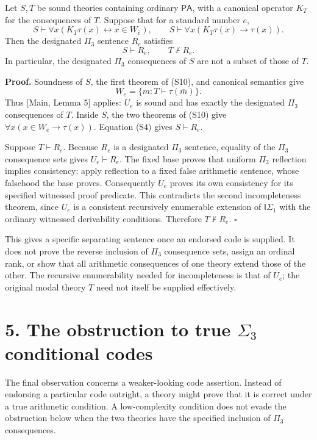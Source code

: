 \documentclass[
  11pt,
  letterpaper,
]{article}
\begin{document}
Let \(S,T\) be sound theories containing ordinary \(\mathsf{PA}\), with
a canonical operator \(K_T\) for the consequences of \(T\). Suppose that
for a standard number \(e\), \[
S\vdash\forall x(K_T\tau(x)\leftrightarrow x\in W_{\bar e}),
\qquad
S\vdash\forall x(K_T\tau(x)\rightarrow\tau(x)).
\tag{S10}
\] Then the designated \(\Pi_3\) sentence \(R_e\) satisfies \[
S\vdash R_e,
\qquad
T\nvdash R_e.
\tag{S11}
\] In particular, the designated \(\Pi_3\) consequences of \(S\) are not
a subset of those of \(T\).

\textbf{Proof.} Soundness of \(S\), the first theorem of (S10), and
canonical semantics give \[
W_e=\{m:T\vdash\tau(\bar m)\}.
\tag{S12}
\] Thus {[}Main, Lemma 5{]} applies: \(U_e\) is sound and has exactly
the designated \(\Pi_3\) consequences of \(T\). Inside \(S\), the two
theorems of (S10) give \(\forall x(x\in W_e\rightarrow\tau(x))\).
Equation (S4) gives \(S\vdash R_e\).

Suppose \(T\vdash R_e\). Because \(R_e\) is a designated \(\Pi_3\)
sentence, equality of the \(\Pi_3\) consequence sets gives
\(U_e\vdash R_e\). The fixed base proves that uniform \(\Pi_3\)
reflection implies consistency: apply reflection to a fixed false
arithmetic sentence, whose falsehood the base proves. Consequently
\(U_e\) proves its own consistency for its specified witnessed proof
predicate. This contradicts the second incompleteness theorem, since
\(U_e\) is a consistent recursively enumerable extension of
\(\mathsf I\Sigma_1\) with the ordinary witnessed derivability
conditions. Therefore \(T\nvdash R_e\). \hfill\(\square\)

This gives a specific separating sentence once an endorsed code is
supplied. It does not prove the reverse inclusion of \(\Pi_3\)
consequence sets, assign an ordinal rank, or show that all arithmetic
consequences of one theory extend those of the other. The recursive
enumerability needed for incompleteness is that of \(U_e\); the original
modal theory \(T\) need not itself be supplied effectively.

\section{\texorpdfstring{5. The obstruction to true \(\Sigma_3\)
conditional
codes}{5. The obstruction to true \textbackslash Sigma\_3 conditional codes}}\label{the-obstruction-to-true-sigma_3-conditional-codes}

The final observation concerns a weaker-looking code assertion. Instead
of endorsing a particular code outright, a theory might prove that it is
correct under a true arithmetic condition. A low-complexity condition
does not evade the obstruction below when the two theories have the
specified inclusion of \(\Pi_3\) consequences.
\end{document}

